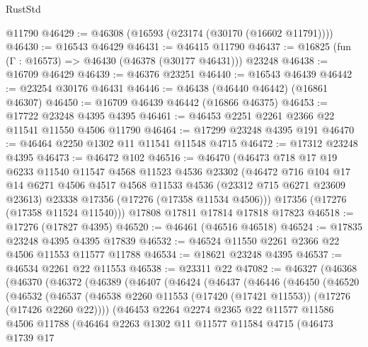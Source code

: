 \begin{lexlean}{RustStd}
\begin{coremodule}
    @11790
@46429 := @46308 (@16593 (@23174 (@30170 (@16602 @11791))))
@46430 := @16543 @46429
@46431 := @46415 @11790
@46437 := @16825 (fun (Γ : @16573) => @46430 (@46378 (@30177 @46431))) @23248
@46438 := @16709 @46429
@46439 := @46376 @23251
@46440 := @16543 @46439
@46442 := @23254 @30176 @46431
@46446 := @46438 (@46440 @46442) (@16861 @46307)
@46450 := @16709 @46439 @46442 (@16866 @46375)
@46453 := @17722 @23248 @4395 @4395
@46461 := @46453 @2251 @2261 @2366 @22 @11541 @11550 @4506 @11790
@46464 := @17299 @23248 @4395 @191
@46470 := @46464 @2250 @1302 @11 @11541 @11548 @4715
@46472 := @17312 @23248 @4395
@46473 := @46472 @102
@46516 := @46470
    (@46473
      @718
      @17
      @19
      @6233
      @11540
      @11547
      @4568
      @11523
      @4536
      @23302
      (@46472
        @716
        @104
        @17
        @14
        @6271
        @4506
        @4517
        @4568
        @11533
        @4536
        (@23312 @715 @6271 @23609 @23613)
        @23338
        @17356
        (@17276 (@17358 @11534 @4506)))
      @17356
      (@17276 (@17358 @11524 @11540)))
    @17808
    @17811
    @17814
    @17818
    @17823
@46518 := @17276 (@17827 @4395)
@46520 := @46461 (@46516 @46518)
@46524 := @17835 @23248 @4395 @4395 @17839
@46532 := @46524 @11550 @2261 @2366 @22 @4506 @11553 @11577 @11788
@46534 := @18621 @23248 @4395
@46537 := @46534 @2261 @22 @11553
@46538 := @23311 @22
@47082 := @46327
    (@46368
      (@46370
        (@46372
          (@46389
            (@46407
              (@46424
                (@46437
                  (@46446
                    (@46450
                      (@46520
                        (@46532
                          (@46537
                            (@46538
                              @2260
                              @11553
                              (@17420 (@17421 @11553))
                              (@17276 (@17426 @2260 @22))))
                          (@46453
                            @2264
                            @2274
                            @2365
                            @22
                            @11577
                            @11586
                            @4506
                            @11788
                            (@46464
                              @2263
                              @1302
                              @11
                              @11577
                              @11584
                              @4715
                              (@46473
                                @1739
                                @17

\end{coremodule}
\end{lexlean}
